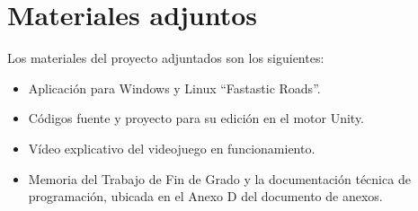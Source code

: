 \section{Materiales adjuntos}

Los materiales del proyecto adjuntados son los siguientes:

\begin{itemize}
\tightlist
	\item Aplicación para Windows y Linux ``Fastastic Roads''.
	\item Códigos fuente y proyecto para su edición en el motor Unity.
	\item Vídeo explicativo del videojuego en funcionamiento.
	\item Memoria del Trabajo de Fin de Grado y la documentación técnica de programación, ubicada en el Anexo D del documento de anexos.
\end{itemize}